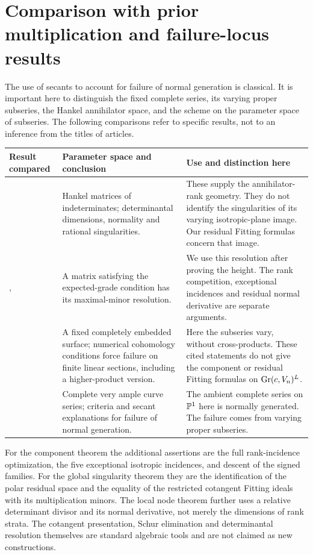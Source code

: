 \section{Comparison with prior multiplication and failure-locus results}
\label{sec:prior-comparison}
The use of secants to account for failure of normal generation is
classical. It is important here to distinguish the fixed complete
series, its varying proper subseries, the Hankel annihilator space,
and the scheme on the parameter space of subseries. The following
comparisons refer to specific results, not to an inference from the
titles of articles.

\begin{center}
\small
\begin{tabular}{@{}p{}p{}p{}@{}}
\toprule
Result compared & Parameter space and conclusion & Use and distinction here\\
\midrule
\cite[Section 1; Theorem 2.1]{CMSV}
& Hankel matrices of indeterminates; determinantal dimensions,
normality and rational singularities.
& These supply the annihilator-rank geometry. They do not identify
the singularities of its varying isotropic-plane image. Our residual
Fitting formulas concern that image.\\[4pt]
\cite{EN}, \cite[Section 2.9]{Kustin}
& A matrix satisfying the expected-grade condition has its
maximal-minor resolution.
& We use this resolution after proving the height. The rank
competition, exceptional incidences and residual normal derivative
are separate arguments.\\[4pt]
\cite[Theorem 0.2; Proposition 2.2]{Ballico96}
& A fixed completely embedded surface; numerical cohomology
conditions force failure on finite linear sections, including a
higher-product version.
& Here the subseries vary, without cross-products. These cited
statements do not give the component or residual Fitting formulas
on $\operatorname{Gr}(c,V_n)^L$.\\[4pt]
\cite[Theorems 1 and 3]{GL86}
& Complete very ample curve series; criteria and secant explanations
for failure of normal generation.
& The ambient complete series on $\mathbb P^1$ here is normally generated.
The failure comes from varying proper subseries.\\
\bottomrule
\end{tabular}
\end{center}

For the component theorem the additional assertions are the full
rank-incidence optimization, the five exceptional isotropic
incidences, and descent of the signed families. For the global
singularity theorem they are the identification of the polar residual
space and the equality of the restricted cotangent Fitting ideals
with its multiplication minors. The local node theorem further uses
a relative determinant divisor and its normal derivative, not merely
the dimensions of rank strata. The cotangent presentation, Schur
elimination and determinantal resolution themselves are standard
algebraic tools and are not claimed as new constructions.

